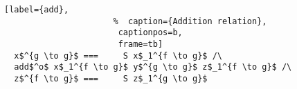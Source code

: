 \begin{figure}[!t]
  \centering
  \begin{minipage}{\columnwidth}
    \begin{lstlisting}[label={add},
                      %  caption={Addition relation},
                       captionpos=b,
                       frame=tb]
  x$^{g \to g}$ ===     S x$_1^{f \to g}$ /\
  add$^o$ x$_1^{f \to g}$ y$^{g \to g}$ z$_1^{f \to g}$ /\
  z$^{f \to g}$ ===     S z$_1^{g \to g}$
    \end{lstlisting}
  \end{minipage}
\end{figure}